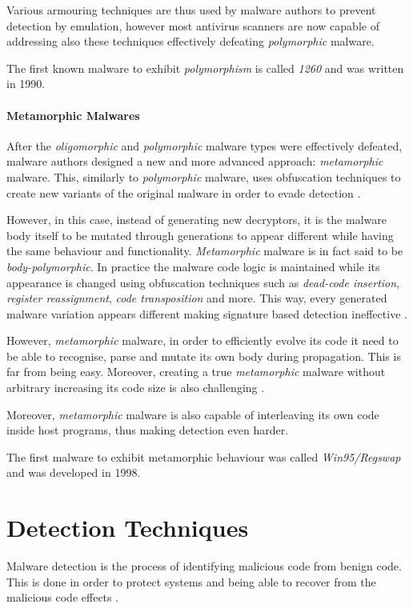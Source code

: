 \documentclass[pdfa%
,cucitura%
]{toptesi}
\begin{document}
Various armouring techniques are thus used by malware authors to prevent detection by emulation, however most antivirus scanners are now capable of addressing also these techniques effectively defeating \textit{polymorphic} malware.

The first known malware to exhibit \textit{polymorphism} is called \textit{1260} and was written in 1990.

\subsubsection{Metamorphic Malwares}
After the \textit{oligomorphic} and \textit{polymorphic} malware types were effectively defeated, malware authors designed a new and more advanced approach: \textit{metamorphic} malware. This, similarly to \textit{polymorphic} malware, uses obfuscation techniques to create new variants of the original malware in order to evade detection \cite{YouMOT}.

However, in this case, instead of generating new decryptors, it is the malware body itself to be mutated through generations to appear different while having the same behaviour and functionality. \textit{Metamorphic} malware is in fact said to be \textit{body-polymorphic}. In practice the malware code logic is maintained while its appearance is changed using obfuscation techniques such as \textit{dead-code insertion}, \textit{register reassignment}, \textit{code transposition} and more. This way, every generated malware variation appears different making signature based detection ineffective \cite{Sharma_2014}.

However, \textit{metamorphic} malware, in order to efficiently evolve its code it need to be able to recognise, parse and mutate its own body during propagation. This is far from being easy. Moreover, creating a true \textit{metamorphic} malware without arbitrary increasing its code size is also challenging \cite{NamanyaTWM}.

Moreover, \textit{metamorphic} malware is also capable of interleaving its own code inside host programs, thus making detection even harder.

The first malware to exhibit metamorphic behaviour was called \textit{Win95/Regswap} and was developed in 1998.

\chapter{Detection Techniques}
Malware detection is the process of identifying malicious code from benign code. This is done in order to protect systems and being able to recover from the malicious code effects \cite{NamanyaTWM}.
\end{document}
